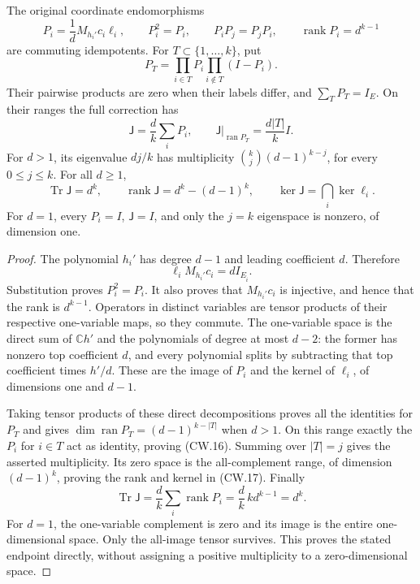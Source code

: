 \begin{theorem}
The original coordinate endomorphisms
\[
 P_i=\frac1dM_{h_i'}c_i\ell_i,\qquad
 P_i^2=P_i,\qquad P_iP_j=P_jP_i,\qquad
 \operatorname{rank}P_i=d^{k-1}
 \tag{CW.14}
\]
are commuting idempotents.  For \(T\subset\{1,\ldots,k\}\), put
\[
 P_T=\prod_{i\in T}P_i\prod_{i\notin T}(I-P_i).
 \tag{CW.15}
\]
Their pairwise products are zero when their labels differ, and
\(\sum_TP_T=I_E\).  On their ranges the full correction has
\[
 \mathsf J=\frac d k\sum_iP_i,\qquad
 \mathsf J|_{\operatorname{ran}P_T}=\frac{d|T|}{k}I .
 \tag{CW.16}
\]
For \(d>1\), its eigenvalue \(dj/k\) has multiplicity
\(\binom kj(d-1)^{k-j}\), for every \(0\le j\le k\).
For all \(d\ge1\),
\[
 \operatorname{Tr}\mathsf J=d^k,\qquad
 \operatorname{rank}\mathsf J=d^k-(d-1)^k,\qquad
 \ker\mathsf J=\bigcap_i\ker\ell_i .
 \tag{CW.17}
\]
For \(d=1\), every \(P_i=I\), \(\mathsf J=I\), and only
the \(j=k\) eigenspace is nonzero, of dimension one.
\end{theorem}
\begin{proof}
The polynomial \(h_i'\) has degree \(d-1\) and leading
coefficient \(d\).  Therefore
\[
 \ell_i M_{h_i'}c_i=dI_{E_{\widehat i}} .
 \tag{CW.18}
\]
Substitution proves \(P_i^2=P_i\).  It also proves that
\(M_{h_i'}c_i\) is injective, and hence that the rank is
\(d^{k-1}\).  Operators in distinct variables are tensor
products of their respective one-variable maps, so they commute.
The one-variable space is the direct sum of
\(\mathbb C h'\) and the polynomials of degree at most \(d-2\):
the former has nonzero top coefficient \(d\), and every
polynomial splits by subtracting that top coefficient times
\(h'/d\).  These are the image of \(P_i\) and the kernel of
\(\ell_i\), of dimensions one and \(d-1\).

Taking tensor products of these direct decompositions proves
all the identities for \(P_T\) and gives
\(\dim\operatorname{ran}P_T=(d-1)^{k-|T|}\) when \(d>1\).
On this range exactly the \(P_i\) for \(i\in T\) act as
identity, proving (CW.16).
Summing over \(|T|=j\) gives the asserted multiplicity.
Its zero space is the all-complement range, of dimension
\((d-1)^k\), proving the rank and kernel in (CW.17).
Finally
\[
 \operatorname{Tr}\mathsf J
   =\frac d k\sum_i\operatorname{rank}P_i
   =\frac d k\,k d^{k-1}=d^k .
 \tag{CW.19}
\]
For \(d=1\), the one-variable complement is zero and its image
is the entire one-dimensional space.  Only the all-image
tensor survives.  This proves the stated endpoint directly,
without assigning a positive multiplicity to a zero-dimensional
space.
\end{proof}

